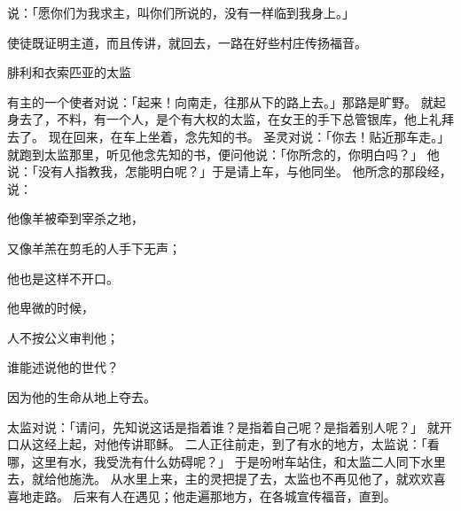 {说：「愿你们为我求主，叫你们所说的，没有一样临到我身上。」
\par }{\PP {}使徒既证明主道，而且传讲，就回{}去，一路在{}好些村庄传扬福音。
\par }{\SH 腓利和衣索匹亚的太监
\par }{\PP {}有主的一个使者对{}说：「起来！向南走，往那从{}下{}的路上去。」那路是旷野。
就起身去了，不料，有一个{}人，是个有大权的太监，在{}女王{}的手下总管银库，他上{}礼拜去了。
现在回来，在车上坐着，念先知{}的书。
圣灵对{}说：「你去！贴近那车走。」
就跑到太监那里，听见他念先知{}的书，便问他说：「你所念的，你明白吗？」
他说：「没有人指教我，怎能明白呢？」于是请{}上车，与他同坐。
他所念的那段经，说：
\par }{\Q 他像羊被牵到宰杀之地，
\par }{\Q 又像羊羔在剪毛的人手下无声；
\par }{\Q 他也是这样不开口。
\par }{\Q {}他卑微的时候，
\par }{\Q 人不按公义审判他；
\par }{\Q 谁能述说他的世代？
\par }{\Q 因为他的生命从地上夺去。
\par }{\PP {}太监对{}说：「请问，先知说这话是指着谁？是指着自己呢？是指着别人呢？」
就开口从这经上起，对他传讲耶稣。
二人正往前走，到了有水的地方，太监说：「看哪，这里有水，我受洗有什么妨碍呢？」
于是吩咐车站住，{}和太监二人同下水里去，{}就给他施洗。
从水里上来，主的灵把{}提了去，太监也不再见他了，就欢欢喜喜地走路。
后来有人在{}遇见{}；他走遍那地方，在各城宣传福音，直到{}。

}
